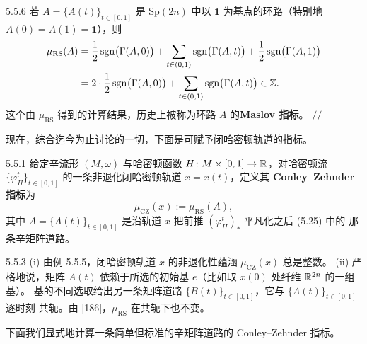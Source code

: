 \begin{wexam}{5.5.6}
  若 $A=\{A(t)\}_{t\in[0,1]}$ 是 $\mathrm{Sp}(2n)$ 中以 $\mathbf{1}$ 为基点的环路（特别地
  $A(0)=A(1)=\mathbf{1}$），则
  \begin{equation*}
  \begin{aligned}
    \mu_{\mathrm{RS}}(A)
      &=\frac12\operatorname{sgn}\bigl(\Gamma(A,0)\bigr)
        +\sum_{t\in(0,1)}\operatorname{sgn}\bigl(\Gamma(A,t)\bigr)
        +\frac12\operatorname{sgn}\bigl(\Gamma(A,1)\bigr)\\
      &=2\cdot\frac12\operatorname{sgn}\bigl(\Gamma(A,0)\bigr)
        +\sum_{t\in(0,1)}\operatorname{sgn}\bigl(\Gamma(A,t)\bigr)\in\mathbb{Z}.
  \end{aligned}
  \end{equation*}
  这个由 $\mu_{\mathrm{RS}}$ 得到的计算结果，历史上被称为环路 $A$ 的\textbf{Maslov 指标}。
  \hfill$//$
\end{wexam}

现在，综合迄今为止讨论的一切，下面是可赋予闭哈密顿轨道的指标。

\begin{wdefn}{5.5.1}
  给定辛流形 $(M,\omega)$ 与哈密顿函数 $H\colon M\times[0,1]\to\mathbb{R}$，对哈密顿流
  $\{\varphi_H^t\}_{t\in[0,1]}$ 的一条非退化闭哈密顿轨道 $x=x(t)$，定义其
  \textbf{Conley--Zehnder 指标}为
  \[
    \mu_{\mathrm{CZ}}(x):=\mu_{\mathrm{RS}}(A),
  \]
  其中 $A=\{A(t)\}_{t\in[0,1]}$ 是沿轨道 $x$ 把前推 $(\varphi_H^t)_*$ 平凡化之后 (5.25) 中的
  那条辛矩阵道路。
\end{wdefn}

\begin{wrem}{5.5.3}
  (i) 由例 5.5.5，闭哈密顿轨道 $x$ 的非退化性蕴涵 $\mu_{\mathrm{CZ}}(x)$ 总是整数。
  (ii) 严格地说，矩阵 $A(t)$ 依赖于所选的初始基 $e$（比如取 $x(0)$ 处纤维 $\mathbb{R}^{2n}$ 的一组基）。
  基的不同选取给出另一条矩阵道路 $\{B(t)\}_{t\in[0,1]}$，它与 $\{A(t)\}_{t\in[0,1]}$ 逐时刻
  共轭。由 [186]，$\mu_{\mathrm{RS}}$ 在共轭下也不变。
\end{wrem}

下面我们显式地计算一条简单但标准的辛矩阵道路的 Conley--Zehnder 指标。

